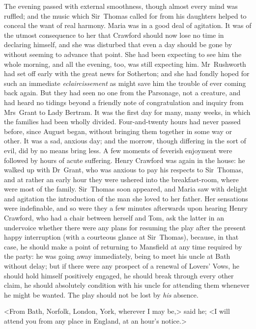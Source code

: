 The evening passed with external smoothness, though almost every mind was ruffled; and the music which Sir~Thomas called for from his daughters helped to conceal the want of real harmony. Maria was in a good deal of agitation. It was of the utmost consequence to her that Crawford should now lose no time in declaring himself, and she was disturbed that even a day should be gone by without seeming to advance that point. She had been expecting to see him the whole morning, and all the evening, too, was still expecting him. Mr~Rushworth had set off early with the great news for Sotherton; and she had fondly hoped for such an immediate \textit{eclaircissement}  as might save him the trouble of ever coming back again. But they had seen no one from the Parsonage, not a creature, and had heard no tidings beyond a friendly note of congratulation and inquiry from Mrs~Grant to Lady Bertram. It was the first day for many, many weeks, in which the families had been wholly divided. Four-and-twenty hours had never passed before, since August began, without bringing them together in some way or other. It was a sad, anxious day; and the morrow, though differing in the sort of evil, did by no means bring less. A few moments of feverish enjoyment were followed by hours of acute suffering. Henry Crawford was again in the house: he walked up with Dr~Grant, who was anxious to pay his respects to Sir~Thomas, and at rather an early hour they were ushered into the breakfast-room, where were most of the family. Sir~Thomas soon appeared, and Maria saw with delight and agitation the introduction of the man she loved to her father. Her sensations were indefinable, and so were they a few minutes afterwards upon hearing Henry Crawford, who had a chair between herself and Tom, ask the latter in an undervoice whether there were any plans for resuming the play after the present happy interruption (with a courteous glance at Sir~Thomas), because, in that case, he should make a point of returning to Mansfield at any time required by the party: he was going away immediately, being to meet his uncle at Bath without delay; but if there were any prospect of a renewal of Lovers' Vows, he should hold himself positively engaged, he should break through every other claim, he should absolutely condition with his uncle for attending them whenever he might be wanted. The play should not be lost by \textit{his}  absence.

<From Bath, Norfolk, London, York, wherever I may be,> said he; <I will attend you from any place in England, at an hour's notice.>

